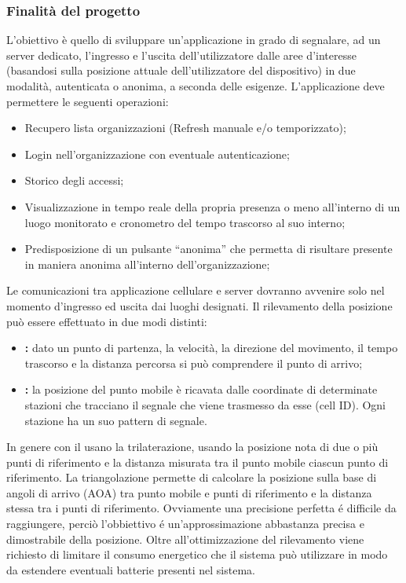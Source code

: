 	\subsubsection{Finalità del progetto}
		L'obiettivo è quello di sviluppare un’applicazione in grado di segnalare, ad un server dedicato, l’ingresso e l’uscita dell'utilizzatore dalle aree d’interesse (basandosi sulla posizione attuale dell'utilizzatore del dispositivo) in due modalità, autenticata o anonima, a seconda delle esigenze.
		L’applicazione deve permettere le seguenti operazioni:
		\begin{itemize}
			\item Recupero lista organizzazioni (Refresh manuale e/o temporizzato);
			\item Login nell'organizzazione con eventuale autenticazione;
			\item Storico degli accessi;
			\item Visualizzazione in tempo reale della propria presenza o meno all'interno di un luogo monitorato e cronometro del tempo trascorso al suo interno;
			\item Predisposizione di un pulsante ``anonima'' che permetta di risultare presente in maniera anonima all'interno dell'organizzazione;
		\end{itemize}
		Le comunicazioni tra applicazione cellulare e server dovranno avvenire solo nel momento d'ingresso ed uscita dai luoghi designati. Il rilevamento della posizione può essere effettuato in due modi distinti:
		\begin{itemize}
			\item \textbf{:} dato un punto di partenza, la velocità, la direzione del movimento, il tempo trascorso e la distanza percorsa si può comprendere il punto di arrivo;
			\item \textbf{:} la posizione del punto mobile è ricavata dalle coordinate di determinate stazioni che tracciano il segnale che viene trasmesso da esse (cell ID). Ogni stazione ha un suo pattern di segnale.
		\end{itemize}
		In genere con il  usano la trilaterazione, usando la posizione nota di due o più punti di riferimento e la distanza misurata tra il punto mobile ciascun punto di riferimento. La triangolazione permette di calcolare la posizione sulla base di angoli di arrivo (AOA) tra punto mobile e punti di riferimento e la distanza stessa tra i punti di riferimento. Ovviamente una precisione perfetta é difficile da raggiungere, perciò l'obbiettivo é un'approssimazione abbastanza precisa e dimostrabile della posizione. Oltre all'ottimizzazione del rilevamento viene richiesto di limitare il consumo energetico che il sistema può utilizzare in modo da estendere eventuali batterie presenti nel sistema.

